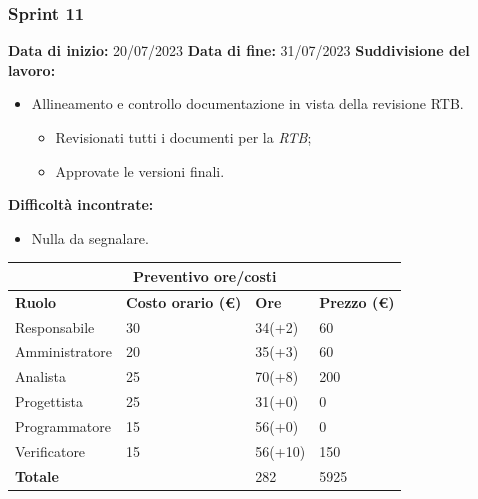 \documentclass[a4paper, 12pt]{article}
\begin{document}
\newpage

\subsubsection{Sprint 11}
\textbf{Data di inizio:} 20/07/2023\newline
\textbf{Data di fine:} 31/07/2023\newline
\newline
\textbf{Suddivisione del lavoro:}
\begin{itemize}
    \item Allineamento e controllo documentazione in vista della revisione RTB.
    \begin{itemize}
        \item Revisionati tutti i documenti per la \textit{RTB};
        \item Approvate le versioni finali.
    \end{itemize}
\end{itemize}
\textbf{Difficoltà incontrate:}
\begin{itemize}
    \item Nulla da segnalare.
\end{itemize}
\begin{center}
	\begin{tabularx}{\textwidth}{|X|X|X|X|}
		\hline
		\multicolumn{4}{|c|}{\textbf{Preventivo ore/costi}}                                      \\
		\hline
		\hline
		\textbf{Ruolo}  & \textbf{Costo orario (\euro)} & \textbf{Ore} & \textbf{Prezzo (\euro)} \\
		\hline
		Responsabile    & 30                            & 34(+2)       & 60                     \\
		\hline
		Amministratore  & 20                            & 35(+3)       & 60                      \\
		\hline
		Analista        & 25                            & 70(+8)       & 200                       \\
		\hline
		Progettista     & 25                            & 31(+0)       & 0                      \\
		\hline
		Programmatore   & 15                            & 56(+0)       & 0                      \\
		\hline
		Verificatore    & 15                            & 56(+10)       & 150                      \\
		\hline
		\hline
		\textbf{Totale} &                               & 282          & 5925                    \\
		\hline
	\end{tabularx}\\[8pt]
	\mbox{}\\
\end{center}
\end{document}
